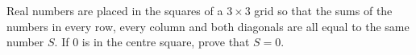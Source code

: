 Real numbers are placed in the squares of a $3\times3$ grid so that the sums of the numbers in every row, every column and both diagonals are all equal to the same number $S$. If $0$ is in the centre square, prove that $S=0$.
